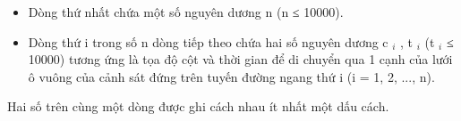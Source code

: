 \begin{itemize}
	\item Dòng thứ nhất chứa một số nguyên dương n (n ≤ 10000).
	\item Dòng thứ i trong số n dòng tiếp theo chứa hai số nguyên dương c $_ i $ , t $_ i $ (t $_ i $ ≤ 10000) tương ứng là tọa độ cột và thời gian để di chuyển qua 1 cạnh của lưới ô vuông của cảnh sát đứng trên tuyến đường ngang thứ i (i = 1, 2, ..., n).
\end{itemize}

Hai số trên cùng một dòng được ghi cách nhau ít nhất một dấu cách.